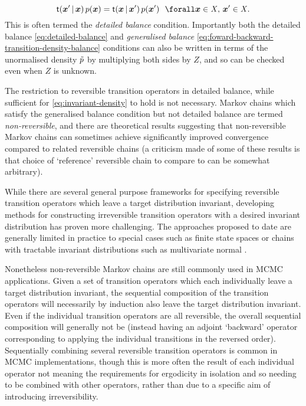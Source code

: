 \begin{equation}\label{eq:detailed-balance}
  \trans(\vct{x}'\gvn\vct{x}) \,\tgtdens(\vct{x}) = 
  \trans(\vct{x}\gvn\vct{x}') \,\tgtdens(\vct{x}')
  ~~\forall \vct{x} \in \set{X},\, \vct{x}' \in \set{X}.
\end{equation}
This is often termed the \emph{detailed balance} condition. Importantly both the detailed balance \eqref{eq:detailed-balance} and \emph{generalised balance} \eqref{eq:foward-backward-transition-density-balance} conditions can also be written in terms of the unormalised density $\tilde{p}$ by multiplying both sides by $Z$, and so can be checked even when $Z$ is unknown.

The restriction to reversible transition operators in detailed balance, while sufficient for \eqref{eq:invariant-density} to hold is not necessary. Markov chains which satisfy the generalised balance condition but not detailed balance are termed \emph{non-reversible}, and there are theoretical results suggesting that non-reversible Markov chains can sometimes achieve significantly improved convergence compared to related reversible chains \citep{diaconis2000analysis,neal2004improving,ichiki2013violation} (a criticism made of some of these results is that choice of `reference' reversible chain to compare to can be somewhat arbitrary\citep{mira2000non}).

While there are several general purpose frameworks for specifying reversible transition operators which leave a target distribution invariant, developing methods for constructing irreversible transition operators with a desired invariant distribution has proven more challenging. The approaches proposed to date are generally limited in practice to special cases such as finite state spaces \citep{suwa2010markov,turitsyn2011irreversible,sun2010improving} or chains with tractable invariant distributions such as multivariate normal \citep{bierkens2016non}. 

Nonetheless non-reversible Markov chains are still commonly used in \ac{MCMC} applications. Given a set of transition operators which each individually leave a target distribution invariant, the sequential composition of the transition operators will necessarily by induction also leave the target distribution invariant. Even if the individual transition operators are all reversible, the overall sequential composition will generally not be (instead having an adjoint `backward' operator corresponding to applying the individual transitions in the reversed order). Sequentially combining several reversible transition operators is common in \ac{MCMC} implementations, though this is more often the result of each individual operator not meaning the requirements for ergodicity in isolation and so needing to be combined with other operators, rather than due to a specific aim of introducing irreversibility.

